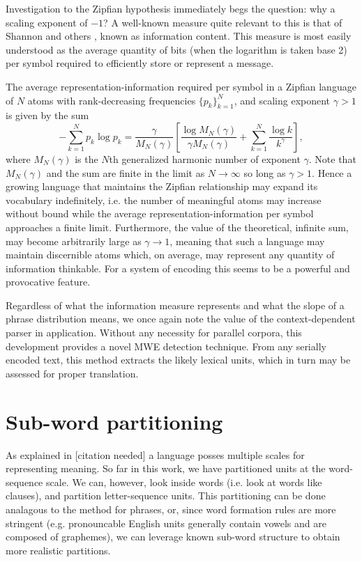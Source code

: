 Investigation to the Zipfian hypothesis immediately begs the question:
why a scaling exponent of $-1$? A well-known measure quite relevant to
this is that of Shannon and others \cite{Kolmogorov01, Shannon01},
known as information content.  This measure is most easily understood
as the average quantity of bits (when the logarithm is taken base 2)
per symbol required to efficiently store or represent a message.

The average representation-information required per symbol in a
Zipfian language of $N$ atoms with rank-decreasing frequencies
$\{p_k\}_{k=1}^N$, and scaling exponent $\gamma>1$ is given by the sum
$$-\sum_{k=1}^{N}p_k\log{p_k}=\frac{\gamma}{M_N(\gamma)}\left[\frac{\log{M_N(\gamma)}}{\gamma M_N(\gamma)}+\sum_{k=1}^{N}\frac{\log{k}}{k^\gamma}\right],$$
where $M_N(\gamma)$ is the $N$th generalized harmonic number of
exponent $\gamma$. Note that $M_N(\gamma)$ and the sum are finite in
the limit as $N\rightarrow\infty$ so long as $\gamma>1$. Hence a
growing language that maintains the Zipfian relationship may expand
its vocabulary indefinitely, i.e. the number of meaningful atoms may
increase without bound while the average representation-information
per symbol approaches a finite limit.  Furthermore, the value of the
theoretical, infinite sum, may become arbitrarily large as
$\gamma\rightarrow1$, meaning that such a language may maintain
discernible atoms which, on average, may represent any quantity of
information thinkable. For a system of encoding this seems to be a
powerful and provocative feature.
 
Regardless of what the information measure represents and what the
slope of a phrase distribution means, we once again note the value of
the context-dependent parser in application. Without any necessity for
parallel corpora, this development provides a novel MWE detection
technique.  From any serially encoded text, this method extracts the
likely lexical units, which in turn may be assessed for proper
translation.

\section{Sub-word partitioning}

As explained in [citation needed] a language posses multiple scales for representing meaning.
So far in this work, we have partitioned units at the word-sequence scale.
We can, however, look inside words (i.e. look at words like clauses), and partition letter-sequence units.
This partitioning can be done analagous to the method for phrases,
or, since word formation rules are more stringent
(e.g. pronouncable English units generally contain vowels and are composed of graphemes),
we can leverage known sub-word structure to obtain more realistic partitions.

